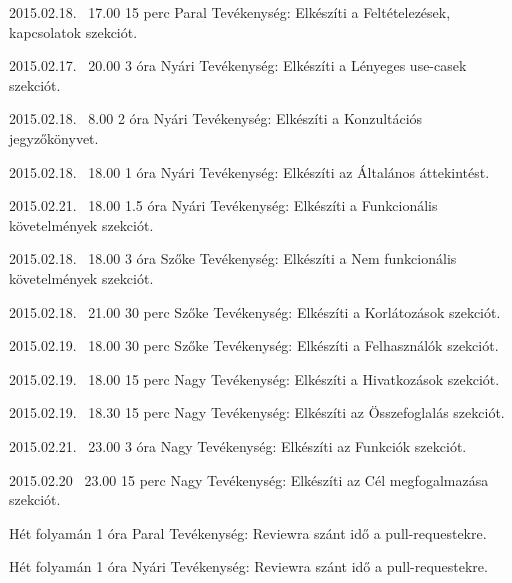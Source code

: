 \begin{naplo}
\bejegyzes
{2015.02.18. ~17.00}
{15 perc}
{Paral} 
{Tevékenység: Elkészíti a Feltételezések, kapcsolatok szekciót.\newline } 

\bejegyzes
{2015.02.17. ~20.00}
{3 óra}
{Nyári} 
{Tevékenység: Elkészíti a Lényeges use-casek szekciót.\newline } 

\bejegyzes
{2015.02.18. ~8.00}
{2 óra}
{Nyári} 
{Tevékenység: Elkészíti a Konzultációs jegyzőkönyvet.\newline } 

\bejegyzes
{2015.02.18. ~18.00}
{1 óra}
{Nyári} 
{Tevékenység: Elkészíti az Általános áttekintést.\newline } 

\bejegyzes
{2015.02.21. ~18.00}
{1.5 óra}
{Nyári} 
{Tevékenység: Elkészíti a Funkcionális követelmények szekciót.\newline } 

\bejegyzes
{2015.02.18. ~18.00}
{3 óra}
{Szőke} 
{Tevékenység: Elkészíti a Nem funkcionális követelmények szekciót.\newline } 

\bejegyzes
{2015.02.18. ~21.00}
{30 perc}
{Szőke} 
{Tevékenység: Elkészíti a Korlátozások szekciót.\newline } 

\bejegyzes
{2015.02.19. ~18.00}
{30 perc}
{Szőke} 
{Tevékenység: Elkészíti a Felhasználók szekciót.\newline } 

\bejegyzes
{2015.02.19. ~18.00}
{15 perc}
{Nagy} 
{Tevékenység: Elkészíti a Hivatkozások szekciót.\newline } 

\bejegyzes
{2015.02.19. ~18.30}
{15 perc}
{Nagy} 
{Tevékenység: Elkészíti az Összefoglalás szekciót.\newline } 

\bejegyzes
{2015.02.21. ~23.00}
{3 óra}
{Nagy} 
{Tevékenység: Elkészíti az Funkciók szekciót.\newline } 

\bejegyzes
{2015.02.20 ~23.00}
{15 perc}
{Nagy} 
{Tevékenység: Elkészíti az Cél megfogalmazása szekciót.\newline } 

\bejegyzes
{Hét folyamán}
{1 óra}
{Paral} 
{Tevékenység: Reviewra szánt idő a pull-requestekre.\newline } 

\bejegyzes
{Hét folyamán}
{1 óra}
{Nyári} 
{Tevékenység: Reviewra szánt idő a pull-requestekre.\newline } 


\end{naplo}
